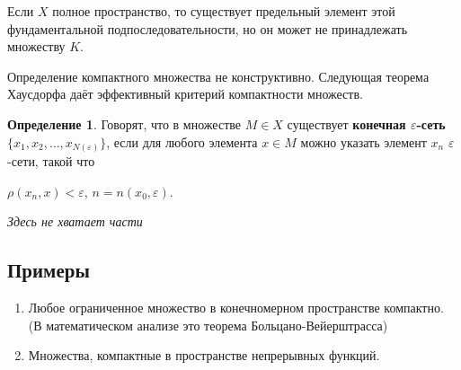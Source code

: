 \documentclass[12pt,a4paper,titlepage]{book}
\theoremstyle{definition}
\newtheorem*{definition}{Определение}
\theoremstyle{plain}
\theoremstyle{remark}
\theoremstyle{remark}
\theoremstyle{remark}
\theoremstyle{plain}
\begin{document}
Если $X$ полное пространство, то существует предельный элемент этой фундаментальной подпоследовательности, но он может не принадлежать множеству $K$.

Определение компактного множества не конструктивно. Следующая теорема Хаусдорфа даёт эффективный критерий компактности множеств.

\begin{definition}
Говорят, что в множестве $M \in X$ существует \textbf{конечная $\varepsilon$-сеть$\lbrace x_1,x_2,\ldots,x_{N(\varepsilon)} \rbrace$}, если для любого элемента $x \in M$ можно указать элемент $x_n$ $\varepsilon$-сети, такой что

\begin{center}
 $\rho(x_n, x) <\varepsilon$, $n=n(x_0,\varepsilon)$.
\end{center}

\end{definition}

\emph{Здесь не хватает части}

\subsection*{Примеры}
\begin{enumerate}

	\item Любое ограниченное множество в конечномерном пространстве компактно. (В математическом анализе это теорема Больцано-Вейерштрасса)

	\item Множества, компактные в пространстве непрерывных функций.
	
\end{enumerate}
\end{document}
